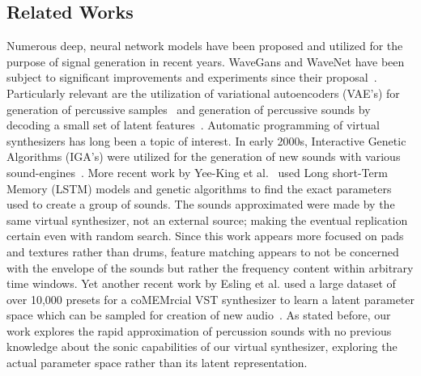 \documentclass[runningheads,a4paper]{llncs}
\begin{document}
\subsection{Related Works}
\label{related_works}
\begin{center}
\begin{table}[h]
\caption{Quick reference of recent related works}
\end{table}
\label{table:recent_works}
\end{center}
Numerous deep, neural network models have been proposed and utilized for the purpose of signal generation in recent years. WaveGans and WaveNet have been subject to significant improvements and experiments since their proposal~\cite{nsynth2017,yamamoto2020parallel,oord2017parallel}. Particularly relevant are the utilization of variational autoencoders (VAE's) for generation of percussive samples~\cite{aouameur2019neural} and generation of percussive sounds by decoding a small set of latent features~\cite{ramires2020neural}.
Automatic programming of virtual synthesizers has long been a topic of interest. In early 2000s, Interactive Genetic Algorithms (IGA's) were utilized for the generation of new sounds with various sound-engines~\cite{johnson1999exploring,dahlstedt2001creating}. More recent work by Yee-King et al.~\cite{yee2018automatic} used Long short-Term Memory (LSTM) models and genetic algorithms to find the exact parameters used to create a group of sounds. The sounds approximated were made by the same virtual synthesizer, not an external source; making the eventual replication certain even with random search. Since this work appears more focused on pads and textures rather than drums, feature matching appears to not be concerned with the envelope of the sounds but rather the frequency content within arbitrary time windows. Yet another recent work by Esling et al. used a large dataset of over 10,000 presets for a coMEMrcial VST synthesizer to learn a latent parameter space which can be sampled for creation of new audio~\cite{esling2019universal}. As stated before, our work explores the rapid approximation of percussion sounds with no previous knowledge about the sonic capabilities of our virtual synthesizer, exploring the actual parameter space rather than its latent representation.
\end{document}
